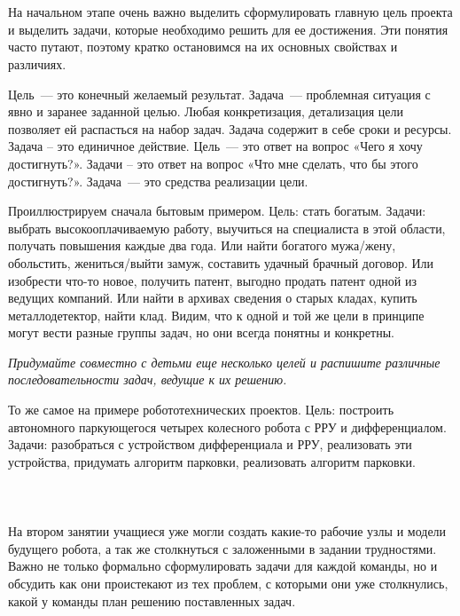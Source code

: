 {\hypertarget{lesson24x3}{}}\\\\

На начальном этапе очень важно выделить сформулировать главную цель проекта и выделить задачи, которые необходимо решить для ее достижения. Эти понятия часто путают, поэтому кратко остановимся на их основных свойствах и различиях.

Цель~--- это конечный желаемый результат. Задача~--- проблемная ситуация с явно и заранее заданной целью. Любая конкретизация, детализация цели позволяет ей распасться на набор задач. Задача содержит в себе сроки и ресурсы. Задача – это единичное действие. Цель~--- это ответ на вопрос «Чего я хочу достигнуть?». Задачи – это ответ на вопрос «Что мне сделать, что бы этого достигнуть?». Задача~--- это средства реализации цели.

Проиллюстрируем сначала бытовым примером. Цель: стать богатым. Задачи: выбрать высокооплачиваемую работу, выучиться на специалиста в этой области, получать повышения каждые два года. Или найти богатого мужа/жену, обольстить, жениться/выйти замуж, составить удачный брачный договор. Или изобрести что-то новое, получить патент, выгодно продать патент одной из ведущих компаний. Или найти в архивах сведения о старых кладах, купить металлодетектор, найти клад. Видим, что к одной и той же цели в принципе могут вести разные группы задач, но они всегда понятны и конкретны.

{\slshape Придумайте совместно с детьми еще несколько целей и распишите различные последовательности задач, ведущие к их решению.}

То же самое на примере робототехнических проектов. Цель: построить автономного паркующегося четырех колесного робота с РРУ и дифференциалом. Задачи: разобраться с устройством дифференциала и РРУ, реализовать эти устройства, придумать алгоритм парковки, реализовать алгоритм парковки.\\\\

{\hypertarget{lesson24x4}{}}\\\\

На втором занятии учащиеся уже могли создать какие-то рабочие узлы и модели будущего робота, а так же столкнуться  с заложенными в задании трудностями. Важно не только формально сформулировать задачи для каждой команды, но и обсудить как они проистекают из тех проблем, с которыми они уже столкнулись, какой у команды план решению поставленных задач.\\\\


